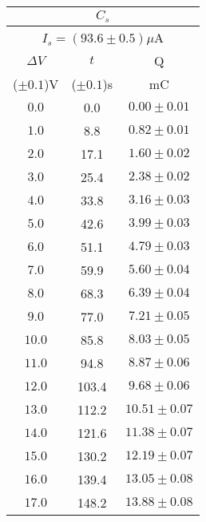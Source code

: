 \documentclass[11pt]{article}
\begin{document}
\begin{minipage}{0.45\textwidth}
\begin{center}
\begin{tabular}{|c|c|c|}
	\hline
	\multicolumn{3}{|c|}{$C_{s}$}\\
	\hline
	\multicolumn{3}{|c|}{$I_{s}=(93.6\pm 0.5)\mu$A}\\
	\hline
	$\Delta V $  & $t$          & Q\\
	($\pm 0.1$)V & ($\pm 0.1$)s & mC\\
	\hline
	$ 0.0$ &   0.0 & $ 0.00\pm 0.01$\\
	$ 1.0$ &   8.8 & $ 0.82\pm 0.01$\\
	$ 2.0$ &  17.1 & $ 1.60\pm 0.02$\\
	$ 3.0$ &  25.4 & $ 2.38\pm 0.02$\\
	$ 4.0$ &  33.8 & $ 3.16\pm 0.03$\\
	$ 5.0$ &  42.6 & $ 3.99\pm 0.03$\\
	$ 6.0$ &  51.1 & $ 4.79\pm 0.03$\\
	$ 7.0$ &  59.9 & $ 5.60\pm 0.04$\\
	$ 8.0$ &  68.3 & $ 6.39\pm 0.04$\\
	$ 9.0$ &  77.0 & $ 7.21\pm 0.05$\\
	$10.0$ &  85.8 & $ 8.03\pm 0.05$\\
	$11.0$ &  94.8 & $ 8.87\pm 0.06$\\
	$12.0$ & 103.4 & $ 9.68\pm 0.06$\\
	$13.0$ & 112.2 & $10.51\pm 0.07$\\
	$14.0$ & 121.6 & $11.38\pm 0.07$\\
	$15.0$ & 130.2 & $12.19\pm 0.07$\\
	$16.0$ & 139.4 & $13.05\pm 0.08$\\
	$17.0$ & 148.2 & $13.88\pm 0.08$\\
	\hline
\end{tabular}
\end{center}
\end{minipage}
\hfill
\end{document}

